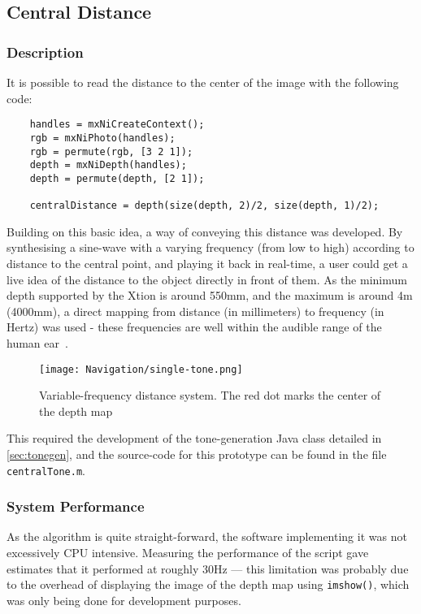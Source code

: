 \subsection{Central Distance}
\label{sec:centraldistance}
\subsubsection{Description}
It is possible to read the distance to the center of the image with the following code:

\begin{verbatim}
    handles = mxNiCreateContext();
    rgb = mxNiPhoto(handles);
    rgb = permute(rgb, [3 2 1]);
    depth = mxNiDepth(handles);
    depth = permute(depth, [2 1]);
    
    centralDistance = depth(size(depth, 2)/2, size(depth, 1)/2);
\end{verbatim}


Building on this basic idea, a way of conveying this distance was developed. By synthesising a sine-wave with a varying frequency (from low to high) according to distance to the central point, and playing it back in real-time, a user could get a live idea of the distance to the object directly in front of them. As the minimum depth supported by the Xtion is around 550mm, and the maximum is around 4m (4000mm), a direct mapping from distance (in millimeters) to frequency (in Hertz) was used - these frequencies are well within the audible range of the human ear~\cite{hearingrange}.

\begin{figure}[H]
\centering
\texttt{[image: Navigation/single-tone.png]}
\caption{Variable-frequency distance system. The red dot marks the center of the depth map}
\end{figure}

This required the development of the tone-generation Java class detailed in \ref{sec:tonegen}, and the source-code for this prototype can be found in the file \texttt{centralTone.m}.

\subsubsection{System Performance}
As the algorithm is quite straight-forward, the software implementing it was not excessively CPU intensive. Measuring the performance of the script gave estimates that it performed at roughly 30Hz --- this limitation was probably due to the overhead of displaying the image of the depth map using \texttt{imshow()}, which was only being done for development purposes.

